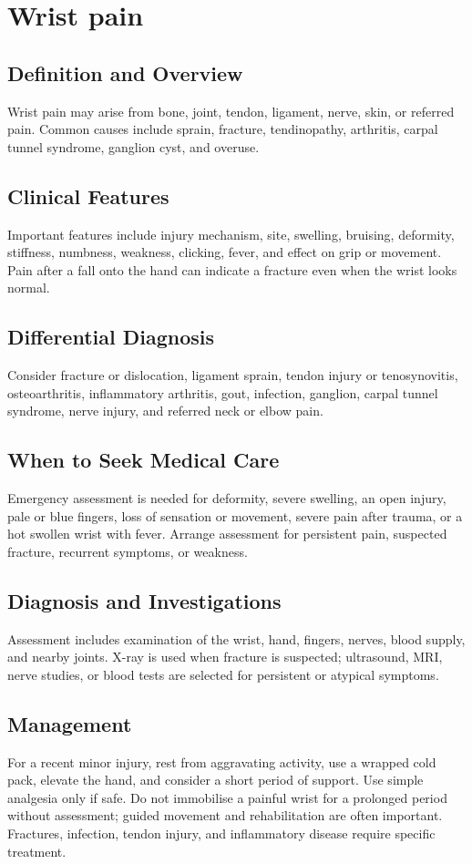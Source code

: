 \chapter{Wrist pain}
\section*{Definition and Overview}
Wrist pain may arise from bone, joint, tendon, ligament, nerve, skin, or referred pain. Common causes include sprain, fracture, tendinopathy, arthritis, carpal tunnel syndrome, ganglion cyst, and overuse.
\section*{Clinical Features}
Important features include injury mechanism, site, swelling, bruising, deformity, stiffness, numbness, weakness, clicking, fever, and effect on grip or movement. Pain after a fall onto the hand can indicate a fracture even when the wrist looks normal.
\section*{Differential Diagnosis}
Consider fracture or dislocation, ligament sprain, tendon injury or tenosynovitis, osteoarthritis, inflammatory arthritis, gout, infection, ganglion, carpal tunnel syndrome, nerve injury, and referred neck or elbow pain.
\section*{When to Seek Medical Care}
Emergency assessment is needed for deformity, severe swelling, an open injury, pale or blue fingers, loss of sensation or movement, severe pain after trauma, or a hot swollen wrist with fever. Arrange assessment for persistent pain, suspected fracture, recurrent symptoms, or weakness.
\section*{Diagnosis and Investigations}
Assessment includes examination of the wrist, hand, fingers, nerves, blood supply, and nearby joints. X-ray is used when fracture is suspected; ultrasound, MRI, nerve studies, or blood tests are selected for persistent or atypical symptoms.
\section*{Management}
For a recent minor injury, rest from aggravating activity, use a wrapped cold pack, elevate the hand, and consider a short period of support. Use simple analgesia only if safe. Do not immobilise a painful wrist for a prolonged period without assessment; guided movement and rehabilitation are often important. Fractures, infection, tendon injury, and inflammatory disease require specific treatment.
